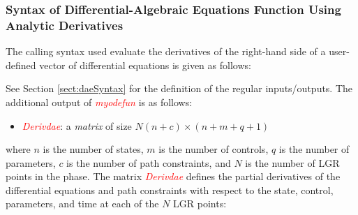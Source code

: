 \documentclass[10pt]{article}
\newcommand{\slred}[1]{\textcolor{red}{\sl #1}}
\begin{document}
\subsubsection{Syntax of Differential-Algebraic Equations Function Using Analytic Derivatives}

The calling syntax used evaluate the derivatives of the right-hand side of a user-defined vector
of differential equations is given as follows:
\begin{center}
\end{center}
See Section \ref{sect:daeSyntax} for the definition of the regular inputs/outputs.
The additional output of \slred{myodefun} is as follows:
\begin{itemize}
  \item \slred{Derivdae}: a {\em matrix} of size $N(n+c) \times (n+m+q+1)$
\end{itemize}
where $n$ is the number of states, $m$ is the number of controls, $q$
is the number of parameters, $c$ is the number of path constraints,
and $N$ is the number of LGR points in the phase.  The matrix
\slred{Derivdae} defines the partial derivatives of the differential
equations and path constraints with respect to the state, control,
parameters, and time at each of the $N$ LGR points: 
\begin{center}
\end{center}
\end{document}
